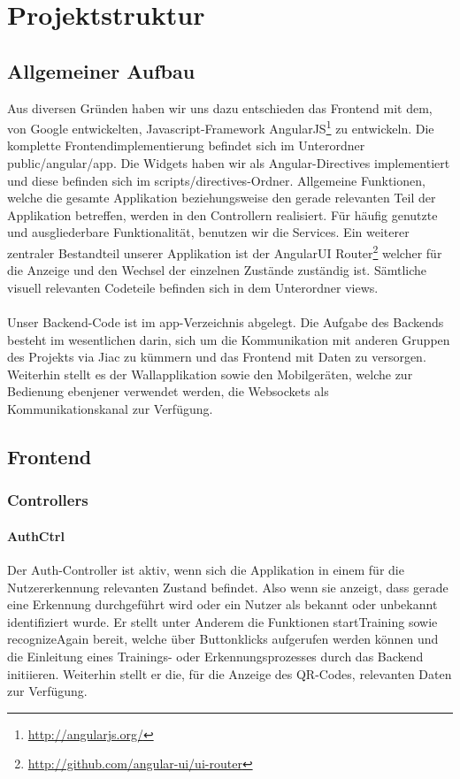 \documentclass[10pt,a4paper]{report}
\newcommand{\code}[1]{{\fontfamily{cmvtt}\selectfont #1}}
\begin{document}
	\section{Projektstruktur}
		\subsection{Allgemeiner Aufbau}
			Aus diversen Gründen haben wir uns dazu entschieden das Frontend mit dem, von Google entwickelten, Javascript-Framework AngularJS\footnote{\href{http://angularjs.org/}{http://angularjs.org/}} zu entwickeln. Die komplette Frontendimplementierung befindet sich im Unterordner \code{public/angular/app}. Die Widgets haben wir als Angular-Directives implementiert und diese befinden sich im \code{scripts/directives}-Ordner. Allgemeine Funktionen, welche die gesamte Applikation beziehungsweise den gerade relevanten Teil der Applikation betreffen, werden in den Controllern realisiert. Für häufig genutzte und ausgliederbare Funktionalität, benutzen wir die Services. Ein weiterer zentraler Bestandteil unserer Applikation ist der AngularUI Router\footnote{\href{http://github.com/angular-ui/ui-router}{http://github.com/angular-ui/ui-router}} welcher für die Anzeige und den Wechsel der einzelnen Zustände zuständig ist. Sämtliche visuell relevanten Codeteile befinden sich in dem Unterordner \code{views}.\\\\
			Unser Backend-Code ist im \code{app}-Verzeichnis abgelegt. Die Aufgabe des Backends  besteht im wesentlichen darin, sich um die Kommunikation mit anderen Gruppen des Projekts via Jiac zu kümmern und das Frontend mit Daten zu versorgen. Weiterhin stellt es der Wallapplikation sowie den Mobilgeräten, welche zur Bedienung ebenjener verwendet werden, die Websockets als Kommunikationskanal zur Verfügung.

		\subsection{Frontend}
			\subsubsection{Controllers}
				\paragraph{AuthCtrl}
					Der Auth-Controller ist aktiv, wenn sich die Applikation in einem für die Nutzererkennung relevanten Zustand befindet. Also wenn sie anzeigt, dass gerade eine Erkennung durchgeführt wird oder ein Nutzer als bekannt oder unbekannt identifiziert wurde. Er stellt unter Anderem die Funktionen \code{startTraining} sowie \code{recognizeAgain} bereit, welche über Buttonklicks aufgerufen werden können und die Einleitung eines Trainings- oder Erkennungsprozesses durch das Backend initiieren. Weiterhin stellt er die, für die Anzeige des QR-Codes, relevanten Daten zur Verfügung.
\end{document}
